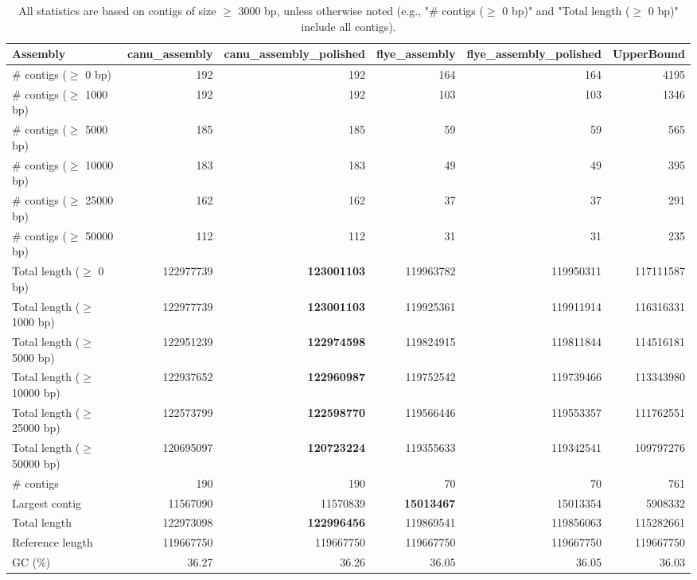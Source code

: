 \documentclass[12pt,a4paper]{article}
\begin{document}
\begin{table}[ht]
\begin{center}
\caption{All statistics are based on contigs of size $\geq$ 3000 bp, unless otherwise noted (e.g., "\# contigs ($\geq$ 0 bp)" and "Total length ($\geq$ 0 bp)" include all contigs).}
\begin{tabular}{|l*{5}{|r}|}
\hline
Assembly & canu\_assembly & canu\_assembly\_polished & flye\_assembly & flye\_assembly\_polished & UpperBound \\ \hline
\# contigs ($\geq$ 0 bp) & 192 & 192 & 164 & 164 & 4195 \\ \hline
\# contigs ($\geq$ 1000 bp) & 192 & 192 & 103 & 103 & 1346 \\ \hline
\# contigs ($\geq$ 5000 bp) & 185 & 185 & 59 & 59 & 565 \\ \hline
\# contigs ($\geq$ 10000 bp) & 183 & 183 & 49 & 49 & 395 \\ \hline
\# contigs ($\geq$ 25000 bp) & 162 & 162 & 37 & 37 & 291 \\ \hline
\# contigs ($\geq$ 50000 bp) & 112 & 112 & 31 & 31 & 235 \\ \hline
Total length ($\geq$ 0 bp) & 122977739 & {\bf 123001103} & 119963782 & 119950311 & 117111587 \\ \hline
Total length ($\geq$ 1000 bp) & 122977739 & {\bf 123001103} & 119925361 & 119911914 & 116316331 \\ \hline
Total length ($\geq$ 5000 bp) & 122951239 & {\bf 122974598} & 119824915 & 119811844 & 114516181 \\ \hline
Total length ($\geq$ 10000 bp) & 122937652 & {\bf 122960987} & 119752542 & 119739466 & 113343980 \\ \hline
Total length ($\geq$ 25000 bp) & 122573799 & {\bf 122598770} & 119566446 & 119553357 & 111762551 \\ \hline
Total length ($\geq$ 50000 bp) & 120695097 & {\bf 120723224} & 119355633 & 119342541 & 109797276 \\ \hline
\# contigs & 190 & 190 & 70 & 70 & 761 \\ \hline
Largest contig & 11567090 & 11570839 & {\bf 15013467} & 15013354 & 5908332 \\ \hline
Total length & 122973098 & {\bf 122996456} & 119869541 & 119856063 & 115282661 \\ \hline
Reference length & 119667750 & 119667750 & 119667750 & 119667750 & 119667750 \\ \hline
GC (\%) & 36.27 & 36.26 & 36.05 & 36.05 & 36.03 \\ \hline

\end{tabular}
\end{center}
\end{table}
\end{document}
